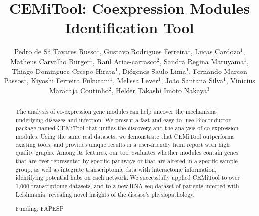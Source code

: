\documentclass[twoside]{article}
\title{\vspace{-15mm}\fontsize{24pt}{10pt}\selectfont\textbf{CEMiTool: Coexpression Modules Identification Tool}} %
\author{Pedro de S\'a Tavares Russo$^1$, Gustavo Rodrigues Ferreira$^1$, Lucas Cardozo$^1$, Matheus Carvalho B\"urger$^1$, Ra\'ul Arias-carrasco$^2$, Sandra Regina Maruyama$^1$, Thiago Dominguez Crespo Hirata$^1$, Di\'ogenes Saulo Lima$^1$, Fernando Marcon Passos$^1$, Kiyoshi Ferreira Fukutani$^1$, Melissa Lever$^1$, Jo\~ao Santana Silva$^1$, Vinicius Maracaja Coutinho$^2$, Helder Takashi Imoto Nakaya$^3$}
\affil{1 USP\\ 2 UNIVERSIDAD MAYOR\\ }
\date{}
\begin{document}
\maketitle %

\thispagestyle{fancy} %


\begin{abstract}
The analysis of co-expression gene modules can help uncover the mechanisms underlying
diseases and infection. We present a fast and easy-to- use Bioconductor package named
CEMiTool that unifies the discovery and the analysis of co-expression modules. Using the
same real datasets, we demonstrate that CEMiTool outperforms existing tools, and provides
unique results in a user-friendly html report with high quality graphs. Among its features, our
tool evaluates whether modules contain genes that are over-represented by specific pathways
or that are altered in a specific sample group, as well as integrate transcriptomic data with
interactome information, identifying potential hubs on each network. We successfully
applied CEMiTool to over 1,000 transcriptome datasets, and to a new RNA-seq dataset of
patients infected with Leishmania, revealing novel insights of the disease's physiopathology.

Funding: FAPESP
\end{abstract}
\end{document}
